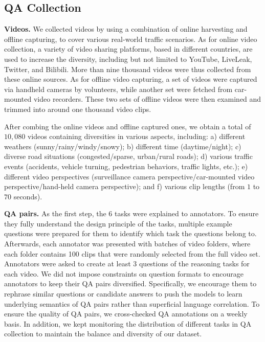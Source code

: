 \documentclass[final]{cvpr}
\begin{document}
\subsection{QA Collection}

{\bf Videos.} We collected videos by using a combination of online harvesting and offline capturing, to cover various real-world traffic scenarios.
As for online video collection, a variety of video sharing platforms, based in different countries, are used to increase the diversity, including but not limited to YouTube, LiveLeak, Twitter, and Bilibili. More than nine thousand videos were thus collected from these online sources.
As for offline video capturing, a set of videos were captured via handheld cameras by volunteers, while another set were fetched from car-mounted video recorders. These two sets of offline videos were then examined and trimmed into around one thousand video clips.

After combing the online videos and offline captured ones, we obtain a total of $10,080$ videos containing diversities in various aspects, including: a) different weathers (sunny/rainy/windy/snowy); b) different time (daytime/night); c) diverse road situations (congested/sparse, urban/rural roads); d) various traffic events (accidents, vehicle turning, pedestrian behaviors, traffic lights, etc.); e) different video perspectives (surveillance camera perspective/car-mounted video perspective/hand-held camera perspective); and f) various clip lengths (from $1$ to $70$ seconds).


{\bf QA pairs.} As the first step, the 6 tasks were explained to annotators. To ensure they fully understand the design principle of the tasks, multiple example questions were prepared for them to identify which task the questions belong to. Afterwards, each annotator was presented with batches of video folders, where each folder contains 100 clips that were randomly selected from the full video set. Annotators were asked to create at least 3 questions of the reasoning tasks for each video.
We did not impose constraints on question formats to encourage annotators to keep their QA pairs diversified. Specifically, we encourage them to rephrase similar questions or candidate answers to push the models to learn underlying semantics of QA pairs rather than superficial language correlation. 
To ensure the quality of QA pairs, we cross-checked QA annotations on a weekly basis. 
In addition, we kept monitoring the distribution of different tasks in QA collection to maintain the balance and diversity of our dataset.
\end{document}
